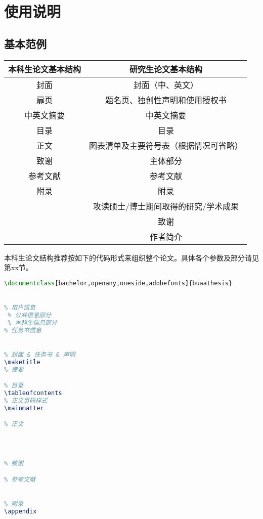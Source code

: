 \chapter{使用说明}
    \section{基本范例}
    \begin{table}[!ht]
    \begin{center}
        \begin{tabular}{|c|c|}
        \hline
        本科生论文基本结构 & 研究生论文基本结构\\\hline\hline
        封面 & 封面（中、英文）\\
        扉页 & 题名页、独创性声明和使用授权书\\
        中英文摘要 & 中英文摘要\\
        目录 & 目录\\
        正文 & 图表清单及主要符号表（根据情况可省略）\\
        致谢 & 主体部分\\
        参考文献 & 参考文献\\
        附录 & 附录\\
        ~~ & 攻读硕士/博士期间取得的研究\slash 学术成果\\
        ~~ & 致谢\\
        ~~ & 作者简介\\
        \hline
        \end{tabular}
        \end{center}
    \end{table}
\qquad 本科生论文结构推荐按如下的代码形式来组织整个论文。具体各个参数及部分请见第xx节。\par
\begin{lstlisting}[language={LaTeX}]
% !Mode:: "TeX:UTF-8"
\documentclass[bachelor,openany,oneside,adobefonts]{buaathesis}


% 用户信息
 % 公共信息部分
 % 本科生信息部分
% 任务书信息


% 封面 & 任务书 & 声明
\maketitle
% 摘要

% 目录
\tableofcontents
% 正文页码样式
\mainmatter

% 正文
	

	

% 致谢

% 参考文献


% 附录
\appendix



\end{lstlisting}
